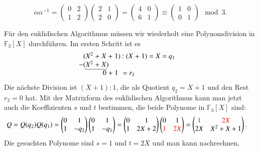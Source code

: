 \begin{loesung}
\begin{teilaufgaben}
\[
\alpha\alpha^{-1}
=
\begin{pmatrix}
0&2\\
1&2
\end{pmatrix}
\begin{pmatrix}
2&1\\
2&0
\end{pmatrix}
=
\begin{pmatrix}
4&0\\
6&1
\end{pmatrix}
\equiv
\begin{pmatrix}
1&0\\
0&1
\end{pmatrix}
\mod 3.
\]
\item
Für den euklidischen Algorithmus müssen wir wiederholt eine Polynomdivision
in $\mathbb{F}_3[X]$ durchführen.
Im ersten Schritt ist es
\[
\arraycolsep=1.4pt
\begin{array}{rcrcrcrcrcr}
 \llap{$($}X^2&+&X&+&1\rlap{$)$}&\;:&(X&+&1)&=&X = q_1\\
\llap{$-($}X^2&+&X\rlap{$)$}& &  & &  & &  & & \\ \cline{1-3}
     & &0&+&1 &\rlap{$\mathstrut = r_1$}\phantom{)}& &  & &  & \\
\end{array}
\]
Die nächste Division ist $(X+1) : 1$, die als Quotient $q_2=X+1$ und den
Rest $r_2=0$ hat.
Mit der Matrixform des euklidischen Algorithmus kann man jetzt auch die
Koeffizienten $s$ und $t$ bestimmen, die beide Polynome in $\mathbb{F}_3[X]$
sind:
\begin{align*}
Q
&=
Q(q_2)
Q(q_1)
=
\begin{pmatrix}
0&1\\1&-q_2
\end{pmatrix}
\begin{pmatrix}
0&1\\1&-q_1
\end{pmatrix}
=
\begin{pmatrix}
0&1\\1&2X+2
\end{pmatrix}
\begin{pmatrix}
0&1\\{\color{red}1}&{\color{red}2X}
\end{pmatrix}
=
\begin{pmatrix}
{\color{red}1}&{\color{red}2X}\\
2X&X^2+X+1
\end{pmatrix}.
\end{align*}
Die gesuchten Polynome sind $s=1$ und $t=2X$ und man kann nachrechnen,

\end{teilaufgaben}
\end{loesung}
